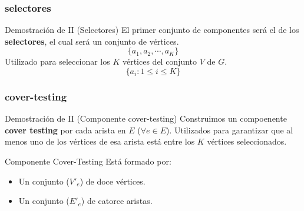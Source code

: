 \documentclass{beamer}
\begin{document}
\subsubsection{selectores}
\begin{frame}{Demostración de II (Selectores)}
    El primer conjunto de componentes será el de los \textbf{selectores}, el cual será un conjunto de vértices.
    \[\{a_1, a_2, \cdots ,a_K\}\]
    Utilizado para seleccionar los $K$ vértices del conjunto $V$ de $G$.
    \[\{a_i : 1 \le i \le K \}\]
\end{frame}

\subsubsection{cover-testing}
\begin{frame}{Demostración de II (Componente cover-testing)}
    Construimos un compoenente \textbf{cover testing} por cada arista en $E$ ($\forall e \in E$).
    Utilizados para garantizar que al menos uno de los vértices de esa arista está entre
    los $K$ vértices seleccionados.\\
    \vfill
    \begin{block}{Componente Cover-Testing}
        Está formado por:
        \begin{itemize}
            \item Un conjunto ($V'_e$) de doce vértices.
            \item Un conjunto ($E'_e$) de catorce aristas.
        \end{itemize}
    \end{block}
\end{frame}
\end{document}

